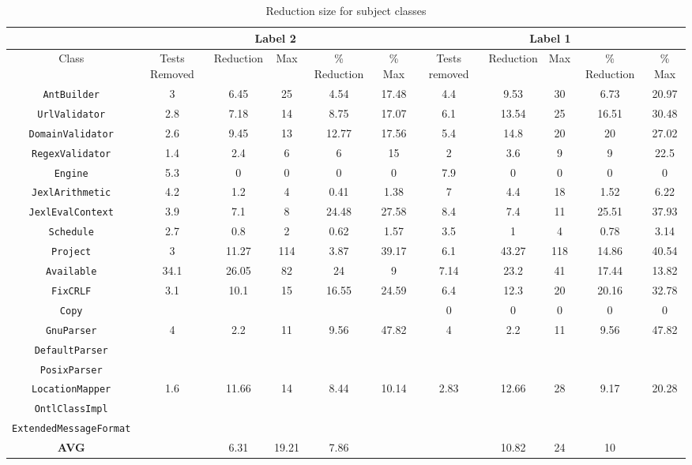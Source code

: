 \begin{table*}
\begin{center}
\begin{tabular}{|c||c|c|c|c|c||c|c|c|c|c|}
\hline
\hline
& \multicolumn{5}{|c|}{Label 2} & \multicolumn{5}{|c|}{Label 1} \\
\hline
Class & Tests Removed & Reduction & Max & \% Reduction & \% Max & Tests removed & Reduction & Max & \% Reduction & \% Max \\
\hline
\hline
{\tt AntBuilder} & 3 & 6.45 & 25 & 4.54 & 17.48 & 4.4 & 9.53 & 30 & 6.73 & 20.97 \\
\hline
{\tt UrlValidator} & 2.8 & 7.18 & 14 & 8.75 & 17.07 & 6.1 & 13.54 & 25 & 16.51 & 30.48 \\
\hline
{\tt DomainValidator} & 2.6 & 9.45 & 13 & 12.77 & 17.56 & 5.4 & 14.8 & 20 & 20 & 27.02 \\
\hline
{\tt RegexValidator} & 1.4 & 2.4 & 6 & 6 & 15 & 2 & 3.6 & 9 & 9 & 22.5 \\
\hline
{\tt Engine} & 5.3 & 0 & 0 & 0 & 0 & 7.9 & 0 & 0 & 0 & 0 \\
\hline
{\tt JexlArithmetic} & 4.2 & 1.2 & 4 & 0.41 & 1.38 & 7 & 4.4 & 18 & 1.52 & 6.22 \\ 
\hline
{\tt JexlEvalContext} & 3.9 & 7.1 & 8 & 24.48 & 27.58 & 8.4 & 7.4 & 11 & 25.51 & 37.93\\
\hline
{\tt Schedule} & 2.7 & 0.8 & 2 & 0.62 & 1.57 & 3.5 & 1 & 4 & 0.78 & 3.14\\
\hline
{\tt Project} & 3 & 11.27 & 114 & 3.87 & 39.17 & 6.1 & 43.27 & 118 & 14.86 & 40.54\\
\hline
{\tt Available} & 34.1 & 26.05 & 82 & 24 & 9 & 7.14 & 23.2 & 41 & 17.44 & 13.82\\
\hline
{\tt FixCRLF} & 3.1 & 10.1 & 15 & 16.55 & 24.59 & 6.4 & 12.3 & 20 & 20.16 & 32.78\\
\hline
{\tt Copy} &  &  &  &  &  & 0 & 0 & 0 & 0 & 0\\
\hline
{\tt GnuParser} & 4 & 2.2 & 11 & 9.56 & 47.82 & 4 & 2.2 & 11 & 9.56 & 47.82\\
\hline
{\tt DefaultParser} &  &  &  &  &  &  &  &  &  & \\
\hline
{\tt PosixParser} &  &  &  &  &  &  &  &  &  & \\
\hline

{\tt LocationMapper} & 1.6 & 11.66 & 14 & 8.44 & 10.14 & 2.83 & 12.66 & 28 & 9.17 & 20.28\\
\hline
{\tt OntlClassImpl} &  &  &  &  &  &  &  &  &  & \\
\hline
{\tt ExtendedMessageFormat} &  &  &  &  &  &  &  &  &  & \\
\hline
\hline
{\bf AVG} & & 6.31 & 19.21 & 7.86 &  &  & 10.82 & 24 & 10 &  \\
\hline
\hline
\end{tabular}
\end{center}
\caption{Reduction size for subject classes}
\label{tab:avgimproved}
\end{table*}

